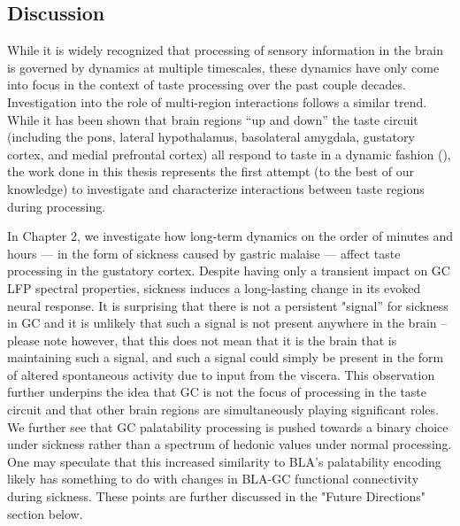 \let\cleardoublepage\clearpage
\begin{refsection}

\chapter{Discussion}

While it is widely recognized that processing of sensory information in the brain is governed by dynamics at multiple timescales, these dynamics have only come into focus in the context of taste processing over the past couple decades. Investigation into the role of multi-region interactions follows a similar trend. While it has been shown that brain regions “up and down” the taste circuit (including the pons, lateral hypothalamus, basolateral amygdala, gustatory cortex, and medial prefrontal cortex) all respond to taste in a dynamic fashion (\cite{katz2001a,fontanini2009a,jezzini2013a,li2013a,baez-santiago2016a}), the work done in this thesis represents the first attempt (to the best of our knowledge) to investigate and characterize interactions between taste regions during processing.

In Chapter 2, we investigate how long-term dynamics on the order of minutes and hours --- in the form of sickness caused by gastric malaise --- affect taste processing in the gustatory cortex. Despite having only a transient impact on GC LFP spectral properties, sickness induces a long-lasting change in its evoked neural response. It is surprising that there is not a persistent "signal” for sickness in GC and it is unlikely that such a signal is not present anywhere in the brain – please note however, that this does not mean that it is the brain that is maintaining such a signal, and such a signal could simply be present in the form of altered spontaneous activity due to input from the viscera. This observation further underpins the idea that GC is not the focus of processing in the taste circuit and that other brain regions are simultaneously playing significant roles. We further see that GC palatability processing is pushed towards a binary choice under sickness rather than a spectrum of hedonic values under normal processing. One may speculate that this increased similarity to BLA’s palatability encoding likely has something to do with changes in BLA-GC functional connectivity during sickness. These points are further discussed in the "Future Directions" section below.


\end{refsection}
